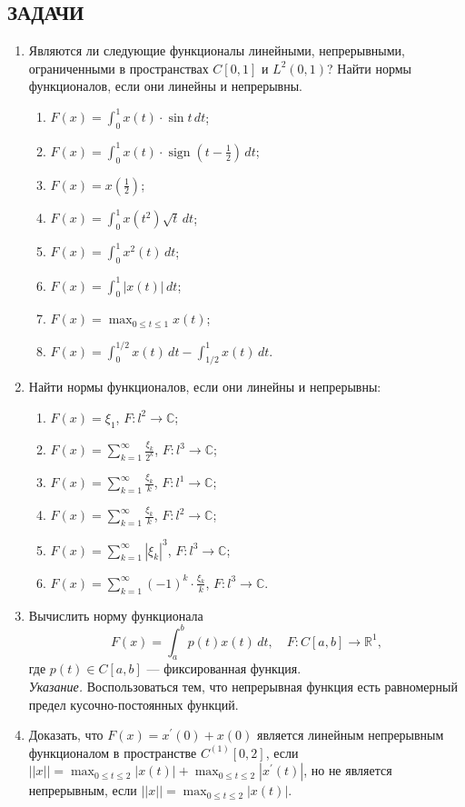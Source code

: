 \documentclass[12pt,a4paper]{article}
\begin{document}
\subsection*{ЗАДАЧИ}
\begin{enumerate}
\item Являются ли следующие функционалы линейными, непрерывными, ограниченными в пространствах $C[0,1]$ и $L^{2}(0,1)$? Найти нормы функционалов, если они линейны и непрерывны.
\begin{enumerate}[label=\alph*)]
\item $F(x) = \int_{0}^{1} x(t) \cdot \sin t \, dt$;
\item $F(x) = \int_{0}^{1} x(t) \cdot \operatorname{sign}(t - \frac{1}{2}) \, dt$;
\item $F(x) = x(\frac{1}{2})$;
\item $F(x) = \int_{0}^{1} x(t^{2}) \sqrt{t} \, dt$;
\item $F(x) = \int_{0}^{1} x^{2}(t) \, dt$;
\item $F(x) = \int_{0}^{1} |x(t)| \, dt$;
\item $F(x) = \max_{0 \le t \le 1} x(t)$;
\item $F(x) = \int_{0}^{1/2} x(t) \, dt - \int_{1/2}^{1} x(t) \, dt$.
\end{enumerate}

\item Найти нормы функционалов, если они линейны и непрерывны:
\begin{enumerate}[label=\alph*)]
\item $F(x) = \xi_{1}$, $F: l^{2} \rightarrow \mathbb{C}$;
\item $F(x) = \sum_{k=1}^{\infty} \frac{\xi_{k}}{2^{k}}$, $F: l^{3} \rightarrow \mathbb{C}$;
\item $F(x) = \sum_{k=1}^{\infty} \frac{\xi_{k}}{k}$, $F: l^{1} \rightarrow \mathbb{C}$;
\item $F(x) = \sum_{k=1}^{\infty} \frac{\xi_{k}}{k}$, $F: l^{2} \rightarrow \mathbb{C}$;
\item $F(x) = \sum_{k=1}^{\infty} |\xi_{k}|^{3}$, $F: l^{3} \rightarrow \mathbb{C}$;
\item $F(x) = \sum_{k=1}^{\infty} (-1)^{k} \cdot \frac{\xi_{k}}{k}$, $F: l^{3} \rightarrow \mathbb{C}$.
\end{enumerate}

\item Вычислить норму функционала
$$F(x) = \int_{a}^{b} p(t)x(t) \, dt, \quad F: C[a,b] \rightarrow \mathbb{R}^{1},$$
где $p(t) \in C[a,b]$ — фиксированная функция.\\
\textit{Указание.} Воспользоваться тем, что непрерывная функция есть равномерный предел кусочно-постоянных функций.

\item Доказать, что $F(x) = x^{\prime}(0) + x(0)$ является линейным непрерывным функционалом в пространстве $C^{(1)}[0,2]$, если $||x|| = \max_{0 \le t \le 2} |x(t)| + \max_{0 \le t \le 2} |x^{\prime}(t)|$, но не является непрерывным, если $||x|| = \max_{0 \le t \le 2} |x(t)|$.
\end{enumerate}
\end{document}
